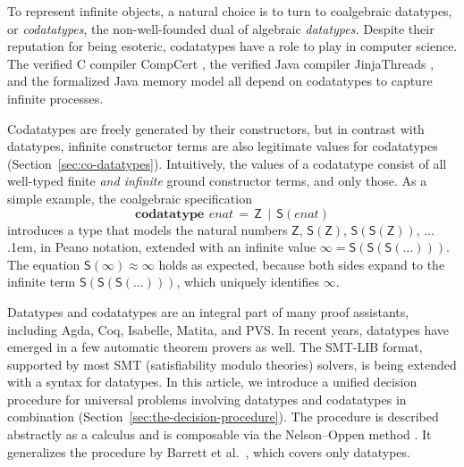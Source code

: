 \documentclass[smallcondensed,draft]{svjour3}
\newcommand\afterLdots{\kern.1em} %
\newcommand\keyw[1]{\textbf{#1}}
\newcommand\const[1]{\textsf{#1}}
\newcommand\ty[1]{\textit{#1}}
\newcommand{\teq}{\approx}
\begin{document}
To represent infinite objects, %
a natural choice is to turn to coalgebraic datatypes, or \emph{codatatypes},
the non-well-founded dual of algebraic \emph{datatypes.}
%
Despite their reputation for being esoteric, codatatypes have a
role to play in computer science. The verified C compiler CompCert
\cite{leroy-2009}, the verified Java compiler Jinja\-Threads
\cite{lochbihler-2010-jinja}, and the formalized Java memory model
\cite{lochbihler-2014-jmm} all depend on codatatypes to capture infinite
processes.

Codatatypes are freely generated by their constructors, but in contrast with datatypes,
infinit\-e constructor terms are also legitimate values for codatatypes
(Section~\ref{sec:co-datatypes}). Intuitively, the
values of a codatatype consist of all well-typed finite \emph{and infinite} ground
constructor
terms, and only those. As a simple example, the coalgebraic specification
%
\[\keyw{codatatype}~\,\ty{enat} \,=\, \const{Z} \,\mid\, \const{S}(\ty{enat})\]
%
introduces a type that
models the natural numbers $\const{Z}$, $\const{S}(\const{Z})$, $\const{S}(\const{S}(\const{Z}))$, $\ldots$\afterLdots{},
in Peano notation, extended with an
infinite value $\infty = \const{S}(\const{S}(\const{S}(\ldots)))$.
The equation $\const{S}(\infty) \teq \infty$ holds as expected,
because both sides expand to the infinite term
$\const{S}(\const{S}(\const{S}(\ldots)))$, which uniquely identifies
$\infty$.

Datatypes and codatatypes are an integral part of many proof assistants,
including Agda, Coq, Isabelle, Matita, and PVS. In recent years, datatypes
have emerged in a few automatic theorem provers as well. The SMT-LIB
\cite{barrett-et-al-2015}
format, supported by most SMT
(satisfiability modulo theories)
solvers, is being extended with a syntax for datatypes.
In this article, we introduce a
unified decision procedure for universal problems involving datatypes and codatatypes
in combination (Section~\ref{sec:the-decision-procedure}).
The procedure is described abstractly as a %
calculus and is composable via the Nelson--Oppen method \cite{nelson-oppen-1979}.
It generalizes the procedure by Barrett et al.\ \cite{barrett-et-al-2007},
which covers only datatypes.
\end{document}
